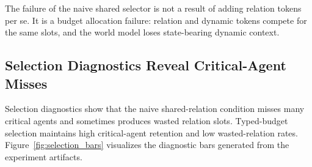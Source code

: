 \documentclass[10pt]{article}
\begin{document}
\begin{table}[t]
\centering
\caption{Stage 0 nuScenes representation sufficiency under a fair 16-slot budget. Lower is better for DynRoll and Rare ADE; higher is better for Collision F1 and IntRec.}
\label{tab:stage0}
\end{table}

The failure of the naive shared selector is not a result of adding relation tokens per se. It is a budget allocation failure: relation and dynamic tokens compete for the same slots, and the world model loses state-bearing dynamic context.

\subsection{Selection Diagnostics Reveal Critical-Agent Misses}
Selection diagnostics show that the naive shared-relation condition misses many critical agents and sometimes produces wasted relation slots. Typed-budget selection maintains high critical-agent retention and low wasted-relation rates. Figure~\ref{fig:selection_bars} visualizes the diagnostic bars generated from the experiment artifacts.
\end{document}
